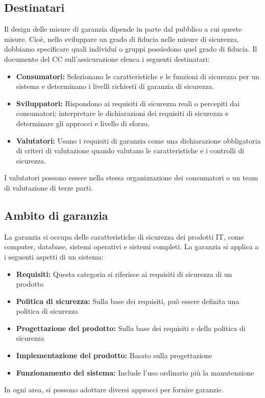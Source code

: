 \subsection{Destinatari}
Il design delle misure di garanzia dipende in parte dal pubblico a cui queste misure. Cioè, nello sviluppare un grado di fiducia nelle misure di sicurezza, dobbiamo specificare quali individui o gruppi possiedono quel grado di fiducia. Il documento del CC sull'assicurazione elenca i seguenti destinatari:
\begin{itemize}
    \item \textbf{Consumatori:} Selezionano le caratteristiche e le funzioni di sicurezza per un sistema e determinano i livelli richiesti di garanzia di sicurezza.
    
    \item \textbf{Sviluppatori:} Rispondono ai requisiti di sicurezza reali o percepiti dai consumatori; interpretare le dichiarazioni dei requisiti di sicurezza e determinare gli approcci e livello di sforzo.
    
    \item \textbf{Valutatori:} Usano i requisiti di garanzia come una dichiarazione obbligatoria di criteri di valutazione quando valutano le caratteristiche e i controlli di sicurezza.
\end{itemize}
I valutatori possono essere nella stessa organizzazione dei consumatori o un team di valutazione di terze parti.
\newpage
\subsection{Ambito di garanzia}
La garanzia si occupa delle caratteristiche di sicurezza dei prodotti IT, come computer, database, sistemi operativi e sistemi completi. La garanzia si applica a i seguenti aspetti di un sistema:
\begin{itemize}
    \item \textbf{Requisiti:} Questa categoria si riferisce ai requisiti di sicurezza di un prodotto

    \item \textbf{Politica di sicurezza:} Sulla base dei requisiti, può essere definita una politica di sicurezza

    \item \textbf{Progettazione del prodotto:} Sulla base dei requisiti e della politica di sicurezza

    \item \textbf{Implementazione del prodotto:} Basato sulla progettazione

    \item \textbf{Funzionamento del sistema:} Include l'uso ordinario più la manutenzione
\end{itemize}
In ogni area, si possono adottare diversi approcci per fornire garanzie. 

